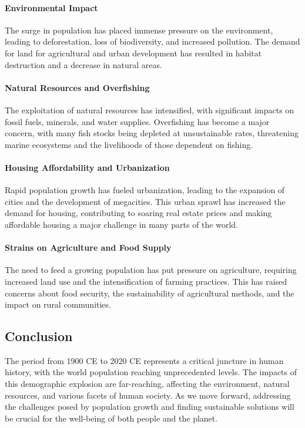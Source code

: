 \documentclass[a4paper,12pt]{book}
\begin{document}
\paragraph{Environmental Impact}
The surge in population has placed immense pressure on the environment, leading to deforestation, loss of biodiversity, and increased pollution. The demand for land for agricultural and urban development has resulted in habitat destruction and a decrease in natural areas.

\paragraph{Natural Resources and Overfishing}
The exploitation of natural resources has intensified, with significant impacts on fossil fuels, minerals, and water supplies. Overfishing has become a major concern, with many fish stocks being depleted at unsustainable rates, threatening marine ecosystems and the livelihoods of those dependent on fishing.

\paragraph{Housing Affordability and Urbanization}
Rapid population growth has fueled urbanization, leading to the expansion of cities and the development of megacities. This urban sprawl has increased the demand for housing, contributing to soaring real estate prices and making affordable housing a major challenge in many parts of the world.

\paragraph{Strains on Agriculture and Food Supply}
The need to feed a growing population has put pressure on agriculture, requiring increased land use and the intensification of farming practices. This has raised concerns about food security, the sustainability of agricultural methods, and the impact on rural communities.

\subsection*{Conclusion}
The period from 1900 CE to 2020 CE represents a critical juncture in human history, with the world population reaching unprecedented levels. The impacts of this demographic explosion are far-reaching, affecting the environment, natural resources, and various facets of human society. As we move forward, addressing the challenges posed by population growth and finding sustainable solutions will be crucial for the well-being of both people and the planet.
\end{document}
